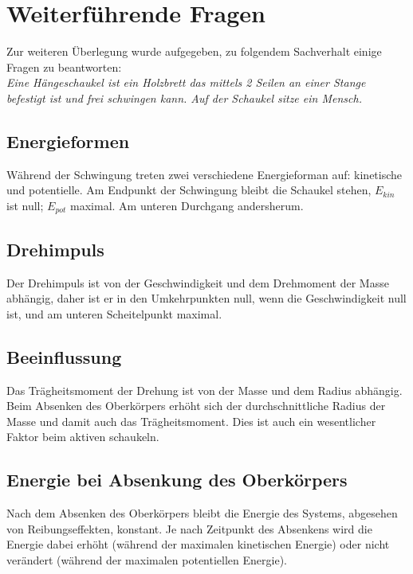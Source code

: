 


\section{Weiterführende Fragen}

Zur weiteren Überlegung wurde aufgegeben, zu folgendem Sachverhalt einige Fragen zu beantworten:\\
\emph{Eine Hängeschaukel ist ein Holzbrett das mittels 2 Seilen an einer Stange befestigt ist und frei schwingen kann.
Auf der Schaukel sitze ein Mensch.}

\subsection{Energieformen}

Während der Schwingung treten zwei verschiedene Energieforman auf: kinetische und potentielle.
Am Endpunkt der Schwingung bleibt die Schaukel stehen, $E_{kin}$ ist null; $E_{pot}$ maximal.
Am unteren Durchgang andersherum.

\subsection{Drehimpuls}

Der Drehimpuls ist von der Geschwindigkeit und dem Drehmoment der Masse abhängig, daher ist er in den Umkehrpunkten null, wenn die Geschwindigkeit null ist, und am unteren Scheitelpunkt maximal.

\subsection{Beeinflussung}

Das Trägheitsmoment der Drehung ist von der Masse und dem Radius abhängig. Beim Absenken des Oberkörpers erhöht sich der durchschnittliche Radius der Masse und damit auch das Trägheitsmoment.
Dies ist auch ein wesentlicher Faktor beim aktiven schaukeln.

\subsection{Energie bei Absenkung des Oberkörpers}

Nach dem Absenken des Oberkörpers bleibt die Energie des Systems, abgesehen von Reibungseffekten, konstant.
Je nach Zeitpunkt des Absenkens wird die Energie dabei erhöht (während der maximalen kinetischen Energie) oder nicht verändert (während der maximalen potentiellen Energie).

